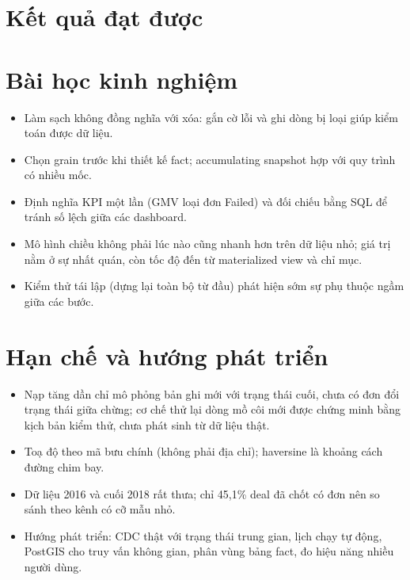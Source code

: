 \section{Kết quả đạt được}

\section{Bài học kinh nghiệm}
\begin{itemize}
  \item Làm sạch không đồng nghĩa với xóa: gắn cờ lỗi và ghi dòng bị loại giúp kiểm toán được dữ liệu.
  \item Chọn grain trước khi thiết kế fact; accumulating snapshot hợp với quy trình có nhiều mốc.
  \item Định nghĩa KPI một lần (GMV loại đơn Failed) và đối chiếu bằng SQL để tránh số lệch giữa các dashboard.
  \item Mô hình chiều không phải lúc nào cũng nhanh hơn trên dữ liệu nhỏ; giá trị nằm ở sự nhất quán, còn tốc độ đến từ materialized view và chỉ mục.
  \item Kiểm thử tái lập (dựng lại toàn bộ từ đầu) phát hiện sớm sự phụ thuộc ngầm giữa các bước.
\end{itemize}

\section{Hạn chế và hướng phát triển}
\begin{itemize}
  \item Nạp tăng dần chỉ mô phỏng bản ghi mới với trạng thái cuối, chưa có đơn đổi trạng thái giữa chừng; cơ chế thử lại dòng mồ côi mới được chứng minh bằng kịch bản kiểm thử, chưa phát sinh từ dữ liệu thật.
  \item Toạ độ theo mã bưu chính (không phải địa chỉ); haversine là khoảng cách đường chim bay.
  \item Dữ liệu 2016 và cuối 2018 rất thưa; chỉ 45,1\% deal đã chốt có đơn nên so sánh theo kênh có cỡ mẫu nhỏ.
  \item Hướng phát triển: CDC thật với trạng thái trung gian, lịch chạy tự động, PostGIS cho truy vấn không gian, phân vùng bảng fact, đo hiệu năng nhiều người dùng.
\end{itemize}
